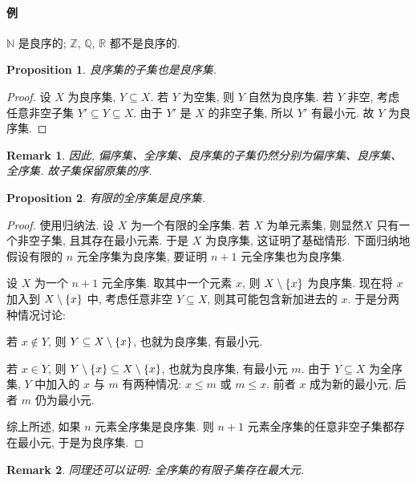 \documentclass[UTF8]{ctexart}
\theoremstyle{mystyle}
\newtheorem{proposition}{Proposition}[section]
\theoremstyle{myremark}
\newtheorem*{remark}{Remark}
\theoremstyle{plain}
\newcommand{\R}{\mathbb R}
\newcommand{\Z}{\mathbb Z}
\newcommand{\N}{\mathbb N}
\newcommand{\Q}{\mathbb Q}
\DeclarePairedDelimiter\set{\{}{\}}
\begin{document}
\paragraph{例}
$ \N $ 是良序的; $ \Z $, $ \Q $, $ \R $ 都不是良序的.

\begin{proposition}
    良序集的子集也是良序集.
\end{proposition}

\begin{proof}
    设 $ X $ 为良序集, $ Y \subseteq X $. 若 $ Y $ 为空集, 则 $ Y $ 自然为良序集. 若 $ Y $ 非空, 考虑任意非空子集 $ Y' \subseteq Y \subseteq X $. 由于 $ Y' $ 是 $ X $ 的非空子集, 所以 $ Y' $ 有最小元. 故 $ Y $ 为良序集.
\end{proof}

\begin{remark}
    因此, 偏序集、全序集、良序集的子集仍然分别为偏序集、良序集、全序集. 故子集保留原集的序.
\end{remark}

\begin{proposition}
    有限的全序集是良序集.
\end{proposition}

\begin{proof}
    使用归纳法. 设 $ X $ 为一个有限的全序集. 若 $ X $ 为单元素集, 则显然$ X $ 只有一个非空子集, 且其存在最小元素. 于是 $ X $ 为良序集, 这证明了基础情形. 下面归纳地假设有限的 $ n $ 元全序集为良序集, 要证明 $ n + 1 $ 元全序集也为良序集. 
    
    设 $ X $ 为一个 $ n + 1 $ 元全序集. 取其中一个元素 $ x $, 则 $ X \setminus \set{x} $ 为良序集. 现在将 $ x $ 加入到 $ X \setminus \set{x} $ 中, 考虑任意非空 $ Y \subseteq X $, 则其可能包含新加进去的 $ x $. 于是分两种情况讨论: 
    
    若 $ x \notin Y $, 则 $ Y \subseteq X \setminus \set{x} $, 也就为良序集, 有最小元.
    
    若 $ x \in Y $, 则 $ Y \setminus \set{x} \subseteq X \setminus \set{x} $, 也就为良序集, 有最小元 $ m $. 由于 $ Y \subseteq X $ 为全序集, $ Y $ 中加入的 $ x $ 与 $ m $ 有两种情况: $ x \le m $ 或 $ m \le x $. 前者 $ x $ 成为新的最小元, 后者 $ m $ 仍为最小元. 

    综上所述, 如果 $ n $ 元素全序集是良序集. 则 $ n + 1 $ 元素全序集的任意非空子集都存在最小元, 于是为良序集.
\end{proof}

\begin{remark}
    同理还可以证明: 全序集的有限子集存在最大元.
\end{remark}
\end{document}
